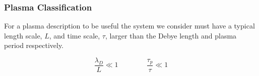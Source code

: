 		\subsubsection{Plasma Classification}
        For a plasma description to be useful the system we consider must have
        a typical length scale, \(L\), and time scale, \(\tau\), larger than the Debye length and plasma
        period respectively.

        \[\frac{\lambda_D}{L} \ll 1  \qquad{} \qquad \frac{\tau_p}{\tau} \ll 1 \]


















